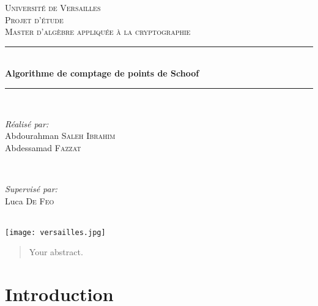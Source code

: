\documentclass[12pt]{article}
\begin{document}
\begin{titlepage}

\newcommand{\HRule}{\rule{\linewidth}{0.5mm}}

\center

\textsc{\LARGE Université de Versailles}\\[1.5cm] 
\textsc{\Large Projet d'étude }\\[0.5cm] 
\textsc{\large Master d'algèbre appliquée à la cryptographie}\\[0.5cm] 


\HRule \\[0.4cm]
{ \huge \bfseries Algorithme de comptage de points de Schoof}\\[0.1cm] 
\HRule \\[1.5cm]
 

\begin{minipage}{0.5\textwidth}
\begin{flushleft} 
\emph{Réalisé par:}\\
Abdourahman \textsc{Saleh Ibrahim}\\
Abdessamad \textsc{Fazzat} 

\end{flushleft}
\end{minipage}
~
\begin{minipage}{0.4\textwidth}
\begin{flushright} 
\emph{Supervisé par:} \\
Luca \textsc{De Feo} 
\end{flushright}
\end{minipage}\\[2cm]


\texttt{[image: versailles.jpg]}
 

\vfill

\end{titlepage}


\begin{abstract}
Your abstract.
\end{abstract}

\section{Introduction}
\end{document}
